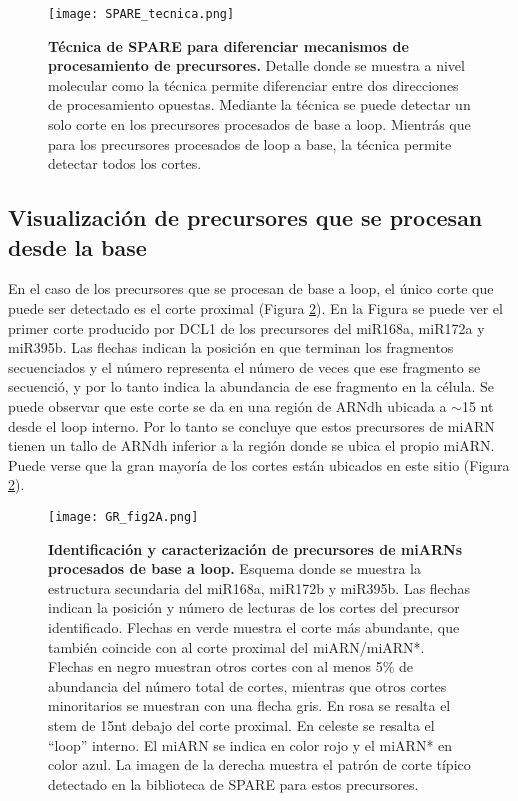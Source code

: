 \begin{figure}[htbp!] 
	\centering    
	\texttt{[image: SPARE\_tecnica.png]}
	\caption[Técnica de SPARE]{
        \textbf{Técnica de SPARE para diferenciar mecanismos de procesamiento de precursores.}
        Detalle donde se muestra a nivel molecular como la técnica permite diferenciar entre dos direcciones de procesamiento opuestas.
        Mediante la técnica se puede detectar un solo corte en los precursores procesados de base a loop.
        Mientrás que para los precursores procesados de loop a base, la técnica permite detectar todos los cortes. 
    }
	 \label{fig:SPARE_tecnica}
\end{figure}

\subsection{Visualización de precursores que se procesan desde la base}

En el caso de los precursores que se procesan de base a loop, el único corte que puede ser detectado es el corte proximal (Figura \ref{fig:GR_fig2A}).
En la Figura se puede ver el primer corte producido por DCL1 de los precursores del miR168a, miR172a y miR395b.
Las flechas indican la posición en que terminan los fragmentos secuenciados y el número representa el número de veces que ese fragmento se secuenció, y por lo tanto indica la abundancia de ese fragmento en la célula.
Se puede observar que este corte se da en una región de ARNdh ubicada a $\sim$15 nt desde el loop interno.
Por lo tanto se concluye que estos precursores de miARN tienen un tallo de ARNdh inferior a la región donde se ubica el propio miARN.
Puede verse que la gran mayoría de los cortes están ubicados en este sitio (Figura \ref{fig:GR_fig2A}).

\begin{figure}[htbp!] 
    \centering    
    \texttt{[image: GR\_fig2A.png]}
    \caption[Identificación y caracterización de precursores de miARNs procesados de base a loop]{
    \textbf{Identificación y caracterización de precursores de miARNs procesados de base a loop.}
            Esquema donde se muestra la estructura secundaria del miR168a, miR172b y miR395b.
            Las flechas indican la posición y número de lecturas de los cortes del precursor identificado.
            Flechas en verde muestra el corte más abundante, que también coincide con al corte proximal del miARN/miARN*.
            Flechas en negro muestran otros cortes con al menos 5\% de abundancia del número total de cortes, mientras que otros cortes minoritarios se muestran con una flecha gris.
            En rosa se resalta el stem de 15nt debajo del corte proximal.
            En celeste se resalta el ``loop'' interno. 
            El miARN se indica en color rojo y el miARN* en color azul.
            La imagen de la derecha muestra el patrón de corte típico detectado en la biblioteca de SPARE para estos precursores.}
    \label{fig:GR_fig2A}
\end{figure}

